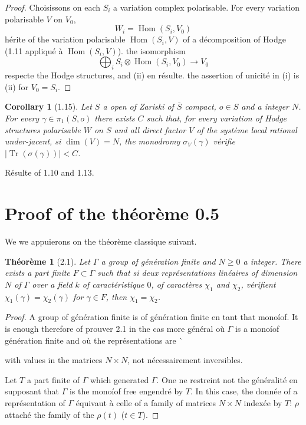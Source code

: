 \documentclass[12pt,a4paper]{article}
\theoremstyle{plain}
\newtheorem{theorem}{Th\'{e}or\`{e}me}[section]
\newtheorem{corollary}{Corollary}[section]
\theoremstyle{definition}
\DeclareMathOperator{\Tr}{Tr}
\DeclareMathOperator{\Hom}{Hom}
\begin{document}
{\begin{proof}
Choisissons on each $S_{i}$ a variation complex polarisable. For every variation polarisable $V$ on $V_{0}$,
\[
W_{i} = \Hom(S_{i}, V_{0})
\]
h\'{e}rite of the variation polarisable $\Hom(S_{i}, V)$ of a d\'{e}composition of Hodge (1.11 appliqu\'{e} \`{a} $\Hom(S_{i}, V)$). the isomorphism
\[
\bigoplus_{i} S_{i} \otimes \Hom(S_{i}, V_{0}) \to V_{0}
\]
respecte the Hodge structures, and (ii) en r\'{e}sulte. the assertion of unicit\'{e} in (i) is (ii) for $V_{0} = S_{i}$.
\end{proof}

\begin{corollary}[1.15]
Let $S$ a open of Zariski of $\bar{S}$ compact, $o \in S$ and a integer $N$. For every $\gamma \in \pi_{1}(S,o)$ there exists $C$ such that, for every variation of Hodge structures polarisable $W$ on $S$ and all direct factor $V$ of the syst\`{e}me local rational under-jacent, si $\dim(V) = N$, the monodromy $\sigma_{V}(\gamma)$ v\'{e}rifie $|\Tr(\sigma(\gamma))| < C$.
\end{corollary}

R\'{e}sulte of 1.10 and 1.13.


\section{Proof of the th\'{e}or\`{e}me 0.5}

We we appuierons on the th\'{e}or\`{e}me classique suivant.

\begin{theorem}[2.1]
Let $\Gamma$ a group of g\'{e}n\'{e}ration finite and $N \geq 0$ a integer. There exists a part finite $F \subset \Gamma$ such that si deux repr\'{e}sentations lin\'{e}aires of dimension $N$ of $\Gamma$ over a field $k$ of caract\'{e}ristique $0$, of caract\`{e}res $\chi_{1}$ and $\chi_{2}$, v\'{e}rifient $\chi_{1}(\gamma) = \chi_{2}(\gamma)$ for $\gamma \in F$, then $\chi_{1} = \chi_{2}$.
\end{theorem}

\begin{proof}
A group of g\'{e}n\'{e}ration finite is of g\'{e}n\'{e}ration finite en tant that mono\'{i}of. It is enough therefore of prouver 2.1 in the cas more g\'{e}n\'{e}ral o\`{u} $\Gamma$ is a mono\'{i}of g\'{e}n\'{e}ration finite and o\`{u} the repr\'{e}sentations are \`{with values in the matrices $N \times N$, not n\'{e}cessairement inversibles.

Let $T$ a part finite of $\Gamma$ which generated $\Gamma$. One ne restreint not the g\'{e}n\'{e}ralit\'{e} en supposant that $\Gamma$ is the mono\'{i}of free engendr\'{e} by $T$. In this case, the donn\'{e}e of a repr\'{e}sentation of $\Gamma$ \'{e}quivaut \`{a} celle of a family of matrices $N \times N$ index\'{e}e by $T$: $\rho$ attach\'{e} the family of the $\rho(t)$ ($t \in T$).

}
\end{proof}}
\end{document}
